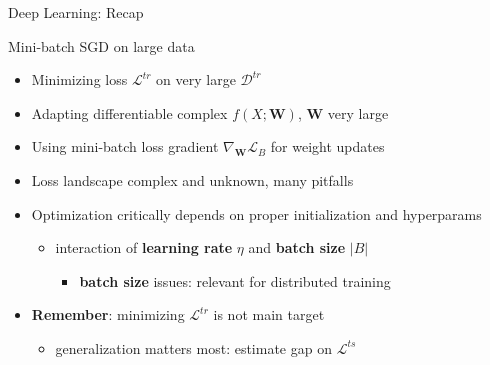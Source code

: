 \begin{frame}{Deep Learning: Recap}
\protect\hypertarget{deep-learning-recap}{}
\begin{block}{Mini-batch SGD on large data}
\protect\hypertarget{mini-batch-sgd-on-large-data}{}
\begin{itemize}
\tightlist
\item
  Minimizing loss \(\mathcal{L}^{tr}\) on very large
  \(\mathcal{D}^{tr}\)
\item
  Adapting differentiable complex \(f(X;\mathbf{W})\), \(\mathbf{W}\)
  very large
\item
  Using mini-batch loss gradient \(\nabla_\mathbf{W} \mathcal{L}_B\) for
  weight updates
\item
  Loss landscape complex and unknown, many pitfalls
\item
  Optimization critically depends on proper initialization and
  hyperparams

  \begin{itemize}
  \tightlist
  \item
    interaction of \textbf{learning rate} \(\eta\) and \textbf{batch
    size} \(\vert B \vert\)

    \begin{itemize}
    \tightlist
    \item
      \textbf{batch size} issues: relevant for distributed training
    \end{itemize}
  \end{itemize}
\item
  \textbf{Remember}: minimizing \(\mathcal{L}^{tr}\) is not main target

  \begin{itemize}
  \tightlist
  \item
    generalization matters most: estimate gap on \(\mathcal{L}^{ts}\)
  \end{itemize}
\end{itemize}
\end{block}

\end{frame}
